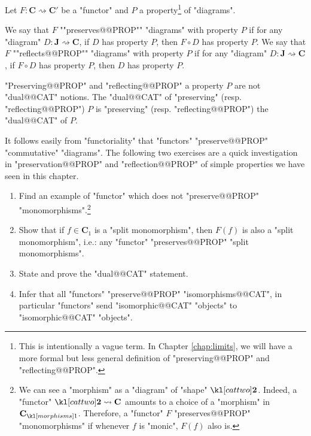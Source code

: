 \documentclass[main.tex]{subfiles}
\begin{document}
\begin{defn}\label{defn:presreflprop}
	Let $F: \mathbf{C} \rightsquigarrow \mathbf{C}'$ be a "functor" and $P$ a property\footnote{This is intentionally a vague term. In Chapter \ref{chap:limits}, we will have a more formal but less general definition of "preserving@@PROP" and "reflecting@@PROP".} of "diagrams".
	\begin{itemize}
		\itemAP[-] We say that $F$ ""preserves@@PROP"" "diagrams" with property $P$ if for any "diagram" $D: \mathbf{J} \rightsquigarrow \mathbf{C}$, if $D$ has property $P$, then $F \circ D$ has property $P$.
		\itemAP[-] We say that $F$ ""reflects@@PROP"" "diagrams" with property $P$ if for any "diagram" $D: \mathbf{J} \rightsquigarrow \mathbf{C}$, if $F \circ D$ has property $P$, then $D$ has property $P$.
	\end{itemize}
\end{defn}
\begin{warn}
	"Preserving@@PROP" and "reflecting@@PROP" a property $P$ are not "dual@@CAT" notions. The "dual@@CAT" of "preserving" (resp. "reflecting@@PROP") $P$ is "preserving" (resp. "reflecting@@PROP") the "dual@@CAT" of $P$. 
\end{warn}
It follows easily from "functoriality" that "functors" "preserve@@PROP" "commutative" "diagrams". The following two exercises are a quick investigation in "preservation@@PROP" and "reflection@@PROP" of simple properties we have seen in this chapter.
\begin{exer}\label{exer:duality:preserving}
	\begin{enumerate}
        \item Find an example of "functor" which does not "preserve@@PROP" "monomorphisms".\footnote{We can see a "morphism" as a "diagram" of "shape" $\cattwo$. Indeed, a "functor" $\cattwo \rightsquigarrow \mathbf{C}$ amounts to a choice of a "morphism" in $\mor{\mathbf{C}}$. Therefore, a "functor" $F$ "preserves@@PROP" "monomorphisms" if whenever $f$ is "monic", $F(f)$ also is.}
        \item Show that if $f \in \mathbf{C}_1$ is a "split monomorphism", then $F(f)$ is also a "split monomorphism", i.e.: any "functor" "preserves@@PROP" "split monomorphisms".
        \item State and prove the "dual@@CAT" statement.
        \item Infer that all "functors" "preserve@@PROP" "isomorphisms@@CAT", in particular "functors" send "isomorphic@@CAT" "objects" to "isomorphic@@CAT" "objects".
    \end{enumerate}
\end{exer}
\end{document}
